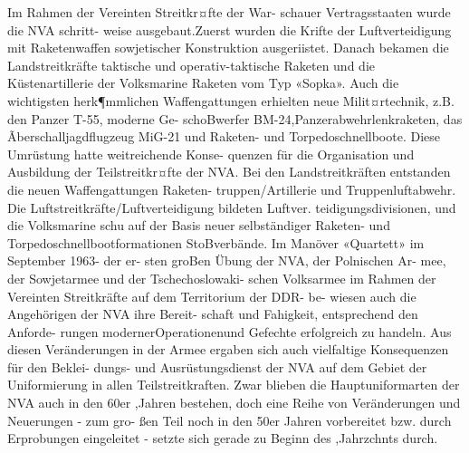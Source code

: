 Im Rahmen der Vereinten Streitkr¤fte der War-
schauer Vertragsstaaten wurde die NVA schritt-
weise ausgebaut.Zuerst wurden die Krifte der
Luftverteidigung mit Raketenwaffen sowjetischer
Konstruktion ausgeriistet. Danach bekamen die
Landstreitkräfte taktische und operativ-taktische
Raketen und die Küstenartillerie der Volksmarine
Raketen vom Typ «Sopka». Auch die wichtigsten
herk¶mmlichen Waffengattungen erhielten neue
Milit¤rtechnik, z.B. den Panzer T-55, moderne Ge-
schoBwerfer BM-24,Panzerabwehrlenkraketen, das
Ãberschalljagdflugzeug MiG-21 und Raketen- und
Torpedoschnellboote.
Diese Umrüstung hatte weitreichende Konse-
quenzen für die Organisation und Ausbildung der
Teilstreitkr¤fte der NVA. Bei den Landstreitkräften
entstanden die neuen Waffengattungen Raketen-
truppen/Artillerie und Truppenluftabwehr. Die
Luftstreitkräfte/Luftverteidigung bildeten Luftver.
teidigungsdivisionen, und die Volksmarine schu
auf der Basis neuer selbständiger Raketen- und Torpedoschnellbootformationen StoBverbände. Im
Manöver «Quartett» im September 1963- der er-
sten groBen Übung der NVA, der Polnischen Ar-
mee, der Sowjetarmee und der Tschechoslowaki-
schen Volksarmee im Rahmen der Vereinten
Streitkräfte auf dem Territorium der DDR- be-
wiesen auch die Angehörigen der NVA ihre Bereit-
schaft und Fahigkeit, entsprechend den Anforde-
rungen modernerOperationenund
Gefechte
erfolgreich zu handeln.
Aus diesen Veränderungen in der Armee ergaben
sich auch vielfaltige Konsequenzen für den Beklei-
dungs- und Ausrüstungsdienst der NVA auf dem
Gebiet der Uniformierung in allen Teilstreitkraften.
Zwar blieben die Hauptuniformarten der NVA
auch in den 60er ,Jahren bestehen, doch eine Reihe
von Veränderungen und Neuerungen - zum gro-
ßen Teil noch in den 50er Jahren vorbereitet bzw.
durch Erprobungen eingeleitet - setzte sich gerade
zu Beginn des ,Jahrzchnts durch.